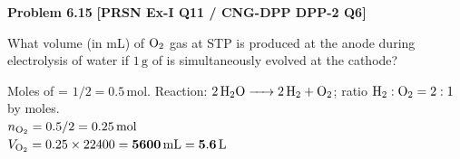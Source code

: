 \begin{problembox}
\textbf{Problem 6.15} \hfill \textbf{[PRSN Ex-I Q11 / CNG-DPP DPP-2 Q6]}

What volume (in mL) of $\ce{O2}$ gas at STP is produced at the anode during electrolysis of water if $1\,\text{g}$ of  is simultaneously evolved at the cathode?
\end{problembox}
\begin{solution}
Moles of  = $1/2 = 0.5\,\text{mol}$.
Reaction: $\ce{2H2O -> 2H2 + O2}$; ratio $\ce{H2}:\ce{O2} = 2:1$ by moles.\\
$n_{\ce{O2}} = 0.5/2 = 0.25\,\text{mol}$\\
$V_{\ce{O2}} = 0.25 \times 22400 = \mathbf{5600\,\text{mL} = 5.6\,\text{L}}$
\end{solution}
